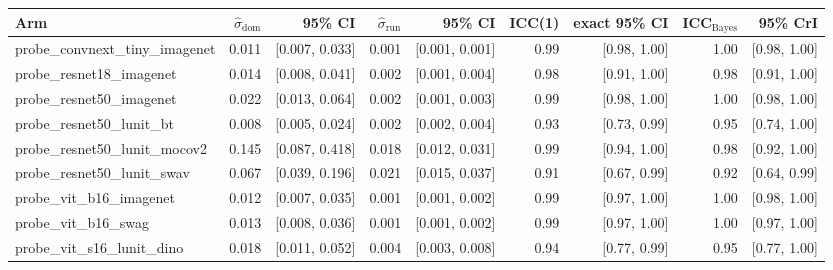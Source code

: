 \begin{tabular}{lrrrrrrrr}
\toprule
Arm & $\hat\sigma_\text{dom}$ & 95\% CI & $\hat\sigma_\text{run}$ & 95\% CI & ICC(1) & exact 95\% CI & ICC$_\text{Bayes}$ & 95\% CrI \\
\midrule
probe\_convnext\_tiny\_imagenet & 0.011 & [0.007, 0.033] & 0.001 & [0.001, 0.001] & 0.99 & [0.98, 1.00] & 1.00 & [0.98, 1.00] \\
probe\_resnet18\_imagenet & 0.014 & [0.008, 0.041] & 0.002 & [0.001, 0.004] & 0.98 & [0.91, 1.00] & 0.98 & [0.91, 1.00] \\
probe\_resnet50\_imagenet & 0.022 & [0.013, 0.064] & 0.002 & [0.001, 0.003] & 0.99 & [0.98, 1.00] & 1.00 & [0.98, 1.00] \\
probe\_resnet50\_lunit\_bt & 0.008 & [0.005, 0.024] & 0.002 & [0.002, 0.004] & 0.93 & [0.73, 0.99] & 0.95 & [0.74, 1.00] \\
probe\_resnet50\_lunit\_mocov2 & 0.145 & [0.087, 0.418] & 0.018 & [0.012, 0.031] & 0.99 & [0.94, 1.00] & 0.98 & [0.92, 1.00] \\
probe\_resnet50\_lunit\_swav & 0.067 & [0.039, 0.196] & 0.021 & [0.015, 0.037] & 0.91 & [0.67, 0.99] & 0.92 & [0.64, 0.99] \\
probe\_vit\_b16\_imagenet & 0.012 & [0.007, 0.035] & 0.001 & [0.001, 0.002] & 0.99 & [0.97, 1.00] & 1.00 & [0.98, 1.00] \\
probe\_vit\_b16\_swag & 0.013 & [0.008, 0.036] & 0.001 & [0.001, 0.002] & 0.99 & [0.97, 1.00] & 1.00 & [0.97, 1.00] \\
probe\_vit\_s16\_lunit\_dino & 0.018 & [0.011, 0.052] & 0.004 & [0.003, 0.008] & 0.94 & [0.77, 0.99] & 0.95 & [0.77, 1.00] \\
\bottomrule
\end{tabular}

